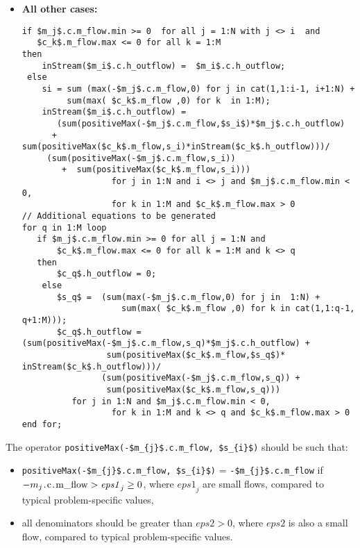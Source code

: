 \begin{nonnormative}
\begin{itemize}
\item\textbf{All other cases:}\newline
\begin{lstlisting}[language=modelica,mathescape=true]
if $m_j$.c.m_flow.min >= 0  for all j = 1:N with j <> i  and
   $c_k$.m_flow.max <= 0 for all k = 1:M
then
    inStream($m_i$.c.h_outflow) =  $m_i$.c.h_outflow;
 else
    si = sum (max(-$m_j$.c.m_flow,0) for j in cat(1,1:i-1, i+1:N) +
         sum(max( $c_k$.m_flow ,0) for k  in 1:M);
    inStream($m_i$.c.h_outflow) =
       (sum(positiveMax(-$m_j$.c.m_flow,$s_i$)*$m_j$.c.h_outflow)
      +  sum(positiveMax($c_k$.m_flow,s_i)*inStream($c_k$.h_outflow)))/
     (sum(positiveMax(-$m_j$.c.m_flow,s_i))
        +  sum(positiveMax($c_k$.m_flow,s_i)))
                  for j in 1:N and i <> j and $m_j$.c.m_flow.min < 0,
                  for k in 1:M and $c_k$.m_flow.max > 0
// Additional equations to be generated
for q in 1:M loop
   if $m_j$.c.m_flow.min >= 0 for all j = 1:N and
       $c_k$.m_flow.max <= 0 for all k = 1:M and k <> q
   then
       $c_q$.h_outflow = 0;
    else
       $s_q$ =  (sum(max(-$m_j$.c.m_flow,0) for j in  1:N) +
                    sum(max( $c_k$.m_flow ,0) for k in cat(1,1:q-1, q+1:M)));
       $c_q$.h_outflow = (sum(positiveMax(-$m_j$.c.m_flow,s_q)*$m_j$.c.h_outflow) +
                 sum(positiveMax($c_k$.m_flow,$s_q$)* inStream($c_k$.h_outflow)))/
                (sum(positiveMax(-$m_j$.c.m_flow,s_q)) +
                 sum(positiveMax($c_k$.m_flow,s_q)))
		  for j in 1:N and $m_j$.c.m_flow.min < 0,
                  for k in 1:M and k <> q and $c_k$.m_flow.max > 0
end for;
\end{lstlisting}
\end{itemize}

The operator
\lstinline[mathescape=true]!positiveMax(-$m_{j}$.c.m_flow, $s_{i}$)!
should be such that:
\begin{itemize}
\item
  \lstinline[mathescape=true]!positiveMax(-$m_{j}$.c.m_flow, $s_{i}$)! =
  \lstinline[mathescape=true]!-$m_{j}$.c.m_flow! if
  $-m_{j}\text{\lstinline!.c.m_flow!} > \mathit{eps1}_{j} \geq 0$,
  where $\mathit{eps1}_{j}$ are small flows, compared to typical
  problem-specific values,
\item
  all denominators should be greater than $\mathit{eps2} > 0$,
  where $\mathit{eps2}$ is also a small flow, compared to typical problem-specific
  values.
\end{itemize}


\end{nonnormative}
